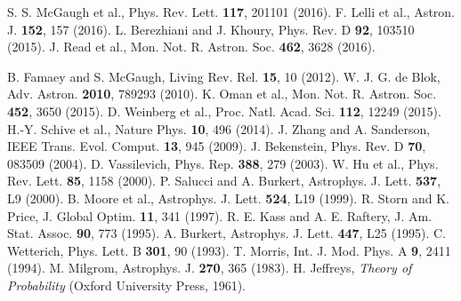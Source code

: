 \documentclass[aps,prd,twocolumn,showpacs,superscriptaddress,groupedaddress,nofootinbib]{revtex4-2}
\begin{document}
\begin{thebibliography}{99}
 S. S. McGaugh et al., Phys. Rev. Lett. \textbf{117}, 201101 (2016).
 F. Lelli et al., Astron. J. \textbf{152}, 157 (2016).
 L. Berezhiani and J. Khoury, Phys. Rev. D \textbf{92}, 103510 (2015).
 J. Read et al., Mon. Not. R. Astron. Soc. \textbf{462}, 3628 (2016).

 B. Famaey and S. McGaugh, Living Rev. Rel. \textbf{15}, 10 (2012).
 W. J. G. de Blok, Adv. Astron. \textbf{2010}, 789293 (2010).
 K. Oman et al., Mon. Not. R. Astron. Soc. \textbf{452}, 3650 (2015).
 D. Weinberg et al., Proc. Natl. Acad. Sci. \textbf{112}, 12249 (2015).
 H.-Y. Schive et al., Nature Phys. \textbf{10}, 496 (2014).
 J. Zhang and A. Sanderson, IEEE Trans. Evol. Comput. \textbf{13}, 945 (2009).
 J. Bekenstein, Phys. Rev. D \textbf{70}, 083509 (2004).
 D. Vassilevich, Phys. Rep. \textbf{388}, 279 (2003).
 W. Hu et al., Phys. Rev. Lett. \textbf{85}, 1158 (2000).
 P. Salucci and A. Burkert, Astrophys. J. Lett. \textbf{537}, L9 (2000).
 B. Moore et al., Astrophys. J. Lett. \textbf{524}, L19 (1999).
 R. Storn and K. Price, J. Global Optim. \textbf{11}, 341 (1997).
 R. E. Kass and A. E. Raftery, J. Am. Stat. Assoc. \textbf{90}, 773 (1995).
 A. Burkert, Astrophys. J. Lett. \textbf{447}, L25 (1995).
 C. Wetterich, Phys. Lett. B \textbf{301}, 90 (1993).
 T. Morris, Int. J. Mod. Phys. A \textbf{9}, 2411 (1994).
 M. Milgrom, Astrophys. J. \textbf{270}, 365 (1983).
 H. Jeffreys, \textit{Theory of Probability} (Oxford University Press, 1961).

\end{thebibliography}
\end{document}
